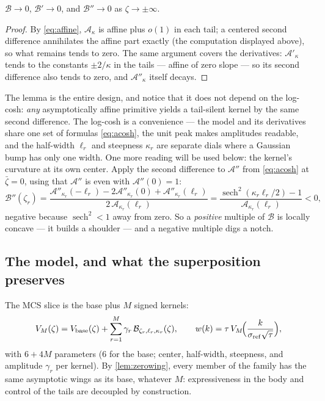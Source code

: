 \begin{lemma}
\label{lem:zerowing}
$\mathcal{B}\to0$, $\mathcal{B}'\to0$, and $\mathcal{B}''\to0$ as
$\zeta\to\pm\infty$.
\end{lemma}

\begin{proof}
By \eqref{eq:affine}, $\mathcal{A}_\kappa$ is affine plus $o(1)$ in
each tail; a centered second difference annihilates the affine part
exactly (the computation displayed above), so what remains tends to
zero.  The same argument covers the derivatives:
$\mathcal{A}'_\kappa$ tends to the constants $\pm2/\kappa$ in the
tails --- affine of zero slope --- so its second difference also tends
to zero, and $\mathcal{A}''_\kappa$ itself decays.
\end{proof}

The lemma is the entire design, and notice that it does not depend on
the log-cosh: \emph{any} asymptotically affine primitive yields a
tail-silent kernel by the same second difference.  The log-cosh is a
convenience --- the model and its derivatives share one set of
formulas \eqref{eq:acosh}, the unit peak makes amplitudes readable,
and the half-width $\ell_r$ and steepness $\kappa_r$ are separate
dials where a Gaussian bump has only one width.  One more reading will
be used below: the kernel's curvature at its own center.  Apply the
second difference to $\mathcal{A}''$ from \eqref{eq:acosh} at
$\bar\zeta=0$, using that $\mathcal{A}''$ is even with
$\mathcal{A}''(0)=1$:
\[
\mathcal{B}''(\zeta_r)
=\frac{\mathcal{A}''_{\kappa_r}(-\ell_r)-2\mathcal{A}''_{\kappa_r}(0)
+\mathcal{A}''_{\kappa_r}(\ell_r)}{2\,\mathcal{A}_{\kappa_r}(\ell_r)}
=\frac{\operatorname{sech}^2(\kappa_r\ell_r/2)-1}
{\mathcal{A}_{\kappa_r}(\ell_r)}<0,
\]
negative because $\operatorname{sech}^2<1$ away from zero.  So a
\emph{positive} multiple of $\mathcal{B}$ is locally concave --- it
builds a shoulder --- and a negative multiple digs a notch.

\subsection{The model, and what the superposition preserves}

The MCS slice is the base plus $M$ signed kernels:
\begin{equation}
V_M(\zeta)=V_{\rm base}(\zeta)
+\sum_{r=1}^{M}\gamma_r\,\mathcal{B}_{\zeta_r,\ell_r,\kappa_r}(\zeta),
\qquad
w(k)=\tau\,V_M\!\Big(\frac{k}{\sigma_{\rm ref}\sqrt\tau}\Big),
\label{eq:mcsmodel}
\end{equation}
with $6+4M$ parameters ($6$ for the base; center, half-width,
steepness, and amplitude $\gamma_r$ per kernel).  By
\cref{lem:zerowing}, every member of the family has the same
asymptotic wings as its base, whatever $M$: expressiveness in the body
and control of the tails are decoupled by construction.

